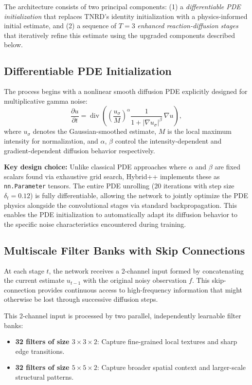 \documentclass[conference]{IEEEtran}
\begin{document}
The architecture consists of two principal components: (1) a \textit{differentiable PDE initialization} that replaces TNRD's identity initialization with a physics-informed initial estimate, and (2) a sequence of $T{=}3$ \textit{enhanced reaction-diffusion stages} that iteratively refine this estimate using the upgraded components described below.

\subsection{Differentiable PDE Initialization}
The process begins with a nonlinear smooth diffusion PDE explicitly designed for multiplicative gamma noise:
\begin{equation}
\frac{\partial u}{\partial t} = \operatorname{div}\!\left( \left(\frac{u_\sigma}{M}\right)^{\!\alpha} \frac{1}{1+|\nabla u_\sigma|^\beta}\, \nabla u \right),
\label{eq:pde}
\end{equation}
where $u_\sigma$ denotes the Gaussian-smoothed estimate, $M$ is the local maximum intensity for normalization, and $\alpha$, $\beta$ control the intensity-dependent and gradient-dependent diffusion behavior respectively.

\textbf{Key design choice:} Unlike classical PDE approaches where $\alpha$ and $\beta$ are fixed scalars found via exhaustive grid search, Hybrid++ implements these as \texttt{nn.Parameter} tensors. The entire PDE unrolling (20 iterations with step size $\delta_t{=}0.12$) is fully differentiable, allowing the network to jointly optimize the PDE physics alongside the convolutional stages via standard backpropagation. This enables the PDE initialization to automatically adapt its diffusion behavior to the specific noise characteristics encountered during training.

\subsection{Multiscale Filter Banks with Skip Connections}
At each stage $t$, the network receives a 2-channel input formed by concatenating the current estimate $u_{t-1}$ with the original noisy observation $f$. This skip-connection provides continuous access to high-frequency information that might otherwise be lost through successive diffusion steps.

This 2-channel input is processed by two parallel, independently learnable filter banks:
\begin{itemize}
\item \textbf{32 filters of size $3{\times}3{\times}2$}: Capture fine-grained local textures and sharp edge transitions.
\item \textbf{32 filters of size $5{\times}5{\times}2$}: Capture broader spatial context and larger-scale structural patterns.
\end{itemize}
\end{document}
